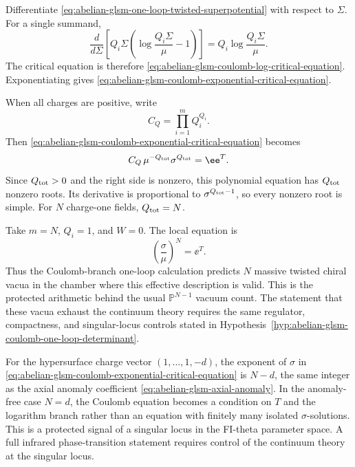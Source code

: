 Differentiate \eqref{eq:abelian-glsm-one-loop-twisted-superpotential} with
respect to \(\Sigma\).  For a single summand,
\[
  \frac{d}{d\Sigma}
  \left[
    Q_i\Sigma\left(\log\frac{Q_i\Sigma}{\mu}-1\right)
  \right]
  =
  Q_i\log\frac{Q_i\Sigma}{\mu}.
\]
The critical equation is therefore
\eqref{eq:abelian-glsm-coulomb-log-critical-equation}.  Exponentiating gives
\eqref{eq:abelian-glsm-coulomb-exponential-critical-equation}.

When all charges are positive, write
\[
  C_Q=\prod_{i=1}^m Q_i^{Q_i}.
\]
Then \eqref{eq:abelian-glsm-coulomb-exponential-critical-equation} becomes
\[
  C_Q\,\mu^{-Q_{\rm tot}}\sigma^{Q_{\rm tot}}=\ee^T .
\]
Since \(Q_{\rm tot}>0\) and the right side is nonzero, this polynomial
equation has \(Q_{\rm tot}\) nonzero roots.  Its derivative is proportional
to \(\sigma^{Q_{\rm tot}-1}\), so every nonzero root is simple.  For \(N\)
charge-one fields, \(Q_{\rm tot}=N\).

\begin{example}
\label{ex:cpn-glsm-coulomb-vacua}
Take \(m=N\), \(Q_i=1\), and \(W=0\).  The local equation is
\[
  \left(\frac{\sigma}{\mu}\right)^N=\ee^T .
\]
Thus the Coulomb-branch one-loop calculation predicts \(N\) massive twisted
chiral vacua in the chamber where this effective description is valid.  This
is the protected arithmetic behind the usual \(\mathbb P^{N-1}\) vacuum
count.  The statement that these vacua exhaust the continuum theory requires
the same regulator, compactness, and singular-locus controls stated in
Hypothesis~\ref{hyp:abelian-glsm-coulomb-one-loop-determinant}.
\end{example}

For the hypersurface charge vector \((1,\ldots,1,-d)\), the exponent of
\(\sigma\) in
\eqref{eq:abelian-glsm-coulomb-exponential-critical-equation} is \(N-d\),
the same integer as the axial anomaly coefficient
\eqref{eq:abelian-glsm-axial-anomaly}.  In the anomaly-free case \(N=d\),
the Coulomb equation becomes a condition on \(T\) and the logarithm branch
rather than an equation with finitely many isolated \(\sigma\)-solutions.
This is a protected signal of a singular locus in the FI-theta parameter
space.  A full infrared phase-transition statement requires control of the
continuum theory at the singular locus.

